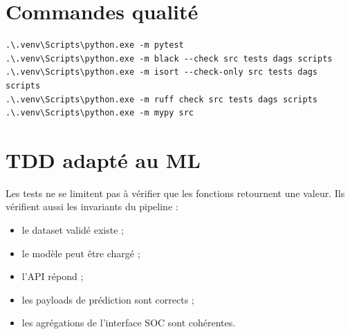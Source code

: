 
\section{Commandes qualité}
\begin{lstlisting}
.\.venv\Scripts\python.exe -m pytest
.\.venv\Scripts\python.exe -m black --check src tests dags scripts
.\.venv\Scripts\python.exe -m isort --check-only src tests dags scripts
.\.venv\Scripts\python.exe -m ruff check src tests dags scripts
.\.venv\Scripts\python.exe -m mypy src
\end{lstlisting}

\section{TDD adapté au ML}
Les tests ne se limitent pas à vérifier que les fonctions retournent une valeur. Ils vérifient aussi les invariants du pipeline :
\begin{itemize}
  \item le dataset validé existe ;
  \item le modèle peut être chargé ;
  \item l'API répond ;
  \item les payloads de prédiction sont corrects ;
  \item les agrégations de l'interface SOC sont cohérentes.
\end{itemize}
